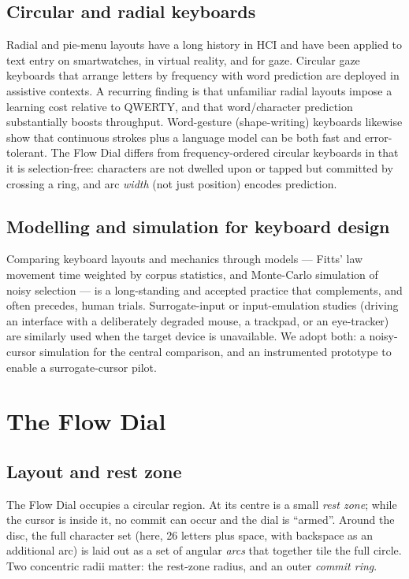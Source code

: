\documentclass[manuscript,review,anonymous]{acmart}
\begin{document}
\subsection{Circular and radial keyboards}
Radial and pie-menu layouts have a long history in HCI and have been applied to
text entry on smartwatches, in virtual reality, and for gaze. Circular gaze
keyboards that arrange letters by frequency with word prediction are deployed in
assistive contexts. A recurring finding is that unfamiliar radial layouts impose
a learning cost relative to QWERTY, and that word/character prediction
substantially boosts throughput. Word-gesture (shape-writing) keyboards likewise
show that continuous strokes plus a language model can be both fast and
error-tolerant. The Flow Dial differs from frequency-ordered circular keyboards
in that it is selection-free: characters are not dwelled upon or tapped but
committed by crossing a ring, and arc \emph{width} (not just position) encodes
prediction.

\subsection{Modelling and simulation for keyboard design}
Comparing keyboard layouts and mechanics through models --- Fitts' law movement
time weighted by corpus statistics, and Monte-Carlo simulation of noisy
selection --- is a long-standing and accepted practice that complements, and
often precedes, human trials. Surrogate-input or input-emulation studies (driving
an interface with a deliberately degraded mouse, a trackpad, or an eye-tracker)
are similarly used when the target device is unavailable. We adopt both: a
noisy-cursor simulation for the central comparison, and an instrumented prototype
to enable a surrogate-cursor pilot.

\section{The Flow Dial}
\subsection{Layout and rest zone}
The Flow Dial occupies a circular region. At its centre is a small
\emph{rest zone}; while the cursor is inside it, no commit can occur and the
dial is ``armed''. Around the disc, the full character set (here, 26 letters
plus space, with backspace as an additional arc) is laid out as a set of angular
\emph{arcs} that together tile the full circle. Two concentric radii matter: the
rest-zone radius, and an outer \emph{commit ring}.
\end{document}
